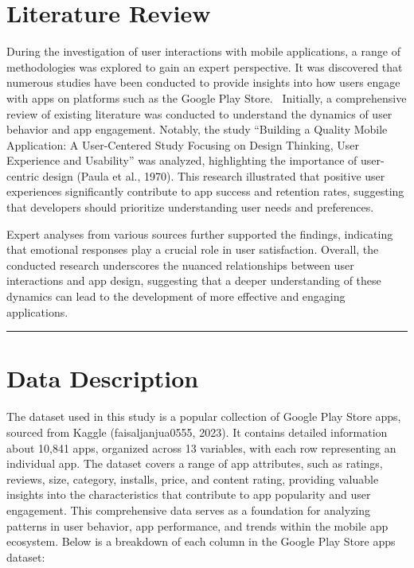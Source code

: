 \documentclass[
]{article}
\begin{document}
\section{\texorpdfstring{\textbf{Literature
Review}}{Literature Review}}\label{literature-review}

During the investigation of user interactions with mobile applications,
a range of methodologies was explored to gain an expert perspective. It
was discovered that numerous studies have been conducted to provide
insights into how users engage with apps on platforms such as the Google
Play Store.~ Initially, a comprehensive review of existing literature
was conducted to understand the dynamics of user behavior and app
engagement. Notably, the study ``Building a Quality Mobile Application:
A User-Centered Study Focusing on Design Thinking, User Experience and
Usability'' was analyzed, highlighting the importance of user-centric
design (Paula et al., 1970). This research illustrated that positive
user experiences significantly contribute to app success and retention
rates, suggesting that developers should prioritize understanding user
needs and preferences.

Expert analyses from various sources further supported the findings,
indicating that emotional responses play a crucial role in user
satisfaction. Overall, the conducted research underscores the nuanced
relationships between user interactions and app design, suggesting that
a deeper understanding of these dynamics can lead to the development of
more effective and engaging applications.

\begin{center}\rule{0.5\linewidth}{0.5pt}\end{center}

\section{\texorpdfstring{\textbf{Data
Description}}{Data Description}}\label{data-description}

The dataset used in this study is a popular collection of Google Play
Store apps, sourced from Kaggle (faisaljanjua0555, 2023). It contains
detailed information about 10,841 apps, organized across 13 variables,
with each row representing an individual app. The dataset covers a range
of app attributes, such as ratings, reviews, size, category, installs,
price, and content rating, providing valuable insights into the
characteristics that contribute to app popularity and user engagement.
This comprehensive data serves as a foundation for analyzing patterns in
user behavior, app performance, and trends within the mobile app
ecosystem. Below is a breakdown of each column in the Google Play Store
apps dataset:
\end{document}
